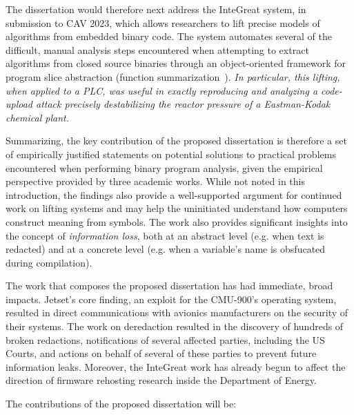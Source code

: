 The dissertation would therefore next address the InteGreat system, in submission to CAV 2023, which allows researchers to lift precise models of algorithms from embedded binary code.
The system automates several of the difficult, manual analysis steps encountered when attempting to extract algorithms from closed source binaries through an object-oriented framework for program slice abstraction (function summarization~\cite{alt2017hifrog}).
\emph{In particular, this lifting, when applied to a PLC, was useful in exactly reproducing and analyzing a code-upload attack precisely destabilizing the reactor pressure of a Eastman-Kodak chemical plant.}

Summarizing, the key contribution of the proposed dissertation is therefore a set of empirically justified statements on potential solutions to practical problems encountered when performing binary program analysis, given the empirical perspective provided by three academic works.
While not noted in this introduction, the findings also provide a well-supported argument for continued work on lifting systems and may help the uninitiated understand how computers construct meaning from symbols.
The work also provides significant insights into the concept of \emph{information loss}, both at an abstract level (e.g. when text is redacted) and at a concrete level (e.g. when a variable's name is obsfucated during compilation).

The work that composes the proposed dissertation has had immediate, broad impacts.
Jetset's core finding, an exploit for the CMU-900's operating system, resulted in direct communications with avionics manufacturers on the security of their systems.
The work on deredaction resulted in the discovery of hundreds of broken redactions, notifications of several affected parties, including the US Courts, and actions on behalf of several of these parties to prevent future information leaks. 
Moreover, the InteGreat work has already begun to affect the direction of firmware rehosting research inside the Department of Energy.

The contributions of the proposed dissertation will be:


